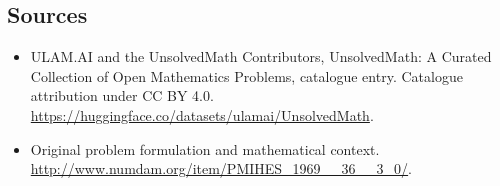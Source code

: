 \documentclass[11pt]{article}
\begin{document}
\subsection{Sources}
\begin{itemize}
\item[\hypertarget{source:statement:1}{S1}] ULAM.AI and the UnsolvedMath Contributors, UnsolvedMath: A Curated Collection of Open Mathematics Problems, catalogue entry. Catalogue attribution under CC BY 4.0.
\url{https://huggingface.co/datasets/ulamai/UnsolvedMath}.
\item[\hypertarget{source:statement:2}{S2}] Original problem formulation and mathematical context.
\url{http://www.numdam.org/item/PMIHES_1969__36__3_0/}.
\end{itemize}
\label{end:statement}
\end{document}
